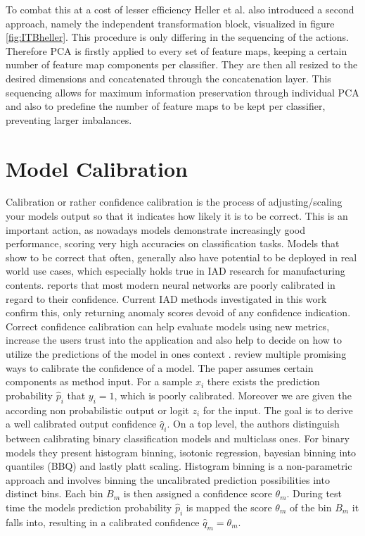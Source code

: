 To combat this at a cost of lesser efficiency Heller et al. also introduced a second approach, namely the independent transformation block, 
visualized in figure \ref{fig:ITBheller}. 
This procedure is only differing in the sequencing of the actions. Therefore PCA is firstly applied to every set of feature maps, keeping 
a certain number of feature map components per classifier. They are then all resized to the desired dimensions and concatenated through 
the concatenation layer. This sequencing allows for maximum information preservation through individual PCA and also to predefine the number 
of feature maps to be kept per classifier, preventing larger imbalances.



\section{Model Calibration}
\label{sec:modelcalibration}
Calibration or rather confidence calibration is the process of adjusting/scaling your models output so that it indicates how likely it is to be correct. This is an important action, as nowadays 
models demonstrate increasingly good performance, scoring very high accuracies on classification tasks. Models that show to be correct that often, generally also have potential to be deployed in 
real world use cases, which especially holds true in IAD research for manufacturing contents. \cite{Guo_2017_tempscalingetc} reports that most modern neural networks are poorly calibrated in regard 
to their confidence. Current IAD methods investigated in this work confirm this, only returning anomaly scores devoid of any confidence indication. Correct confidence calibration can help evaluate 
models using new metrics, increase the users trust into the application and also help to decide on how to utilize the predictions of the model in ones context \cite{whyUncertaintyIsImportant}. 
\newline
\cite{Guo_2017_tempscalingetc} review multiple promising ways to calibrate the confidence of a model. The paper assumes certain components as method input. For a sample $x_i$ there exists the 
prediction probability $\hat{p}_i$ that $y_i = 1$, which is poorly calibrated. Moreover we are given the according non probabilistic output or logit $z_i$ for the input. The goal is to derive a 
well calibrated output confidence $\hat{q}_i$.
On a top level, the authors distinguish between calibrating binary classification models and multiclass 
ones. For binary models they present histogram binning, isotonic regression, bayesian binning into quantiles (BBQ) and lastly platt scaling. 
Histogram binning is a non-parametric approach and involves binning the uncalibrated prediction possibilities into distinct bins. Each bin $B_m$ is then assigned a confidence score $\theta _m$. During 
test time the models prediction probability $\hat{p}_i$ is mapped the score $\theta _m$ of the bin $B_m$ it falls into, resulting in a calibrated confidence $\hat{q}_m = \theta _m$.


